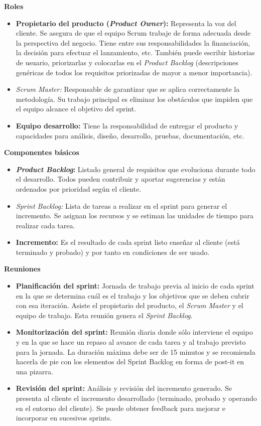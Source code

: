 \noindent
\textbf{Roles}
\begin{itemize}
\item \textbf{Propietario del producto (\textit{Product Owner}):} Representa la voz del cliente. Se asegura de que el equipo Scrum trabaje de forma adecuada desde la perspectiva del negocio. Tiene entre sus responsabilidades la financiación, la decisión para efectuar el lanzamiento, etc. También puede escribir historias de usuario, priorizarlas y colocarlas en el \textit{Product Backlog} (descripciones genéricas de todos los requisitos priorizadas de mayor a menor importancia).
\item \textit{Scrum Master:} Responsable de garantizar que se aplica correctamente la metodología. Su trabajo principal es eliminar los obstáculos que impiden que el equipo alcance el objetivo del sprint.
\item \textbf{Equipo desarrollo:} Tiene la responsabilidad de entregar el producto y capacidades para análisis, diseño, desarrollo, pruebas, documentación, etc.
\end{itemize}

\noindent
\textbf{Componentes básicos}
\begin{itemize}
\item \textbf{\textit{Product Backlog}:} Listado general de requisitos que evoluciona durante todo el desarrollo. Todos pueden contribuir y aportar sugerencias y están ordenados por prioridad según el cliente.
\item \textit{Sprint Backlog:} Lista de tareas a realizar en el sprint para generar el incremento. Se asignan los recursos y se estiman las unidades de tiempo para realizar cada tarea.
\item \textbf{Incremento:} Es el resultado de cada sprint listo enseñar al cliente (está terminado y probado) y por tanto en condiciones de ser usado.
\end{itemize}

\noindent
\textbf{Reuniones}
\begin{itemize}
\item \textbf{Planificación del sprint:} Jornada de trabajo previa al inicio de cada sprint en la que se determina cuál es el trabajo y los objetivos que se deben cubrir con esa iteración. Asiste el propietario del producto, el \textit{Scrum Master} y el equipo de trabajo. Esta reunión genera el \textit{Sprint Backlog}.
\item \textbf{Monitorización del sprint:} Reunión diaria donde sólo interviene el equipo y en la que se hace un repaso al avance de cada tarea y al trabajo previsto para la jornada. La duración máxima debe ser de 15 minutos y se recomienda hacerla de pie con los elementos del Sprint Backlog en forma de post-it en una pizarra.
\item \textbf{Revisión del sprint:} Análisis y revisión del incremento generado. Se presenta al cliente el incremento desarrollado (terminado, probado y operando en el entorno del cliente). Se puede obtener feedback para mejorar e incorporar en sucesivos sprints.
\end{itemize}

